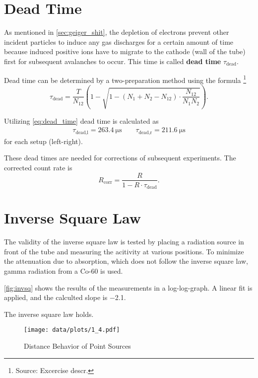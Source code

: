 \section{Dead Time}
As mentioned in \autoref{sec:geiger_shit}, the depletion of electrons prevent other incident particles to induce any gas discharges for a certain amount of time because induced positive ions have to migrate to the cathode (wall of the tube) first for subsequent avalanches to occur.
This time is called \textbf{dead time} $\tau_\text{dead}$.

Dead time can be determined by a two-preparation method using the formula \footnote{Source: Excercise descr.}
\begin{equation}\label{eq:dead_time}
	\tau_\text{dead} = \frac{T}{N_{12}}\left(1-\sqrt{1-\left(N_1+N_2-N_{12}\right)\cdot\frac{N_{12}}{N_1N_2}}\right).
\end{equation}

Utilizing \autoref{eq:dead_time} dead time is calculated as
\begin{gather*}
 	\tau_\text{dead,l}=\SI{263.4}{\micro\second}\qquad \tau_\text{dead,r}=\SI{211.6}{\micro\second}
\end{gather*}
for each setup (left-right).

These dead times are needed for corrections of subsequent experiments.
The corrected count rate is
\begin{equation}\label{eq:dead_time_corr}
	R_\text{corr}=\frac{R}{1-R\cdot\tau_\text{dead}}.
\end{equation}

\section{Inverse Square Law}
The validity of the inverse square law is tested by placing a radiation source in front of the tube and measuring the acitivity at various positions.
To minimize the attenuation due to absorption, which does not follow the inverse square law, gamma radiation from a Co-60 is used.

\autoref{fig:invsq} shows the results of the measurements in a log-log-graph.
A linear fit is applied, and the calculted slope is \num{-2.1}.

The inverse square law holds.

\begin{figure}[tb]
	\centering
	\texttt{[image: data/plots/1\_4.pdf]}
	\caption{Distance Behavior of Point Sources}
	\label{fig:invsq}
\end{figure}
